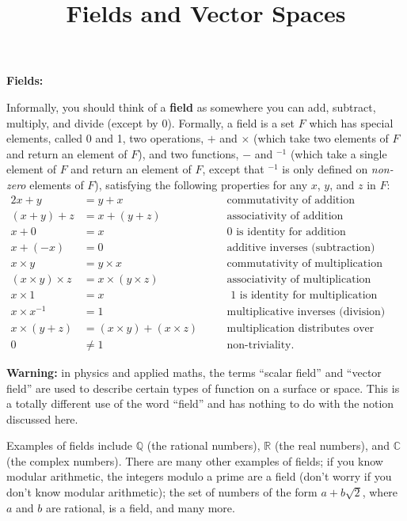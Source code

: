 \documentclass{article}
\begin{document}
\title{Fields and Vector Spaces}
\date{}

\maketitle
\thispagestyle{empty}

\Large



\textbf{Fields:}\bigskip

Informally, you should think of a \textbf{field} as somewhere you can add, subtract, multiply, and divide (except by 0). Formally, a field is a set $F$ which has special elements, called 0 and 1, two operations, $+$ and $\times$ (which take two elements of $F$ and return an element of $F$), and two functions, $-$ and ${}^{-1}$ (which take a single element of $F$ and return an element of $F$, except that ${}^{-1}$ is only defined on \textit{non-zero} elements of $F$), satisfying the following properties for any $x$, $y$, and $z$ in $F$:
\begin{alignat*}{2}
	x+y&=y+x&& \mbox{commutativity of addition}\\
	(x+y)+z&=x+(y+z)&& \mbox{associativity of addition}\\
	x+0&=x&& \mbox{0 is identity for addition}\\
	x+(-x)&= 0&&\mbox{additive inverses (subtraction)}\\
	x\times y&=y\times x&&\mbox{commutativity of multiplication}\\
	(x\times y)\times z&=x\times (y\times z) &&\mbox{associativity of multiplication}\\
	x\times 1 &= x&&\mbox{ 1 is identity for multiplication}\\
	x\times x^{-1}&=1&&\mbox{multiplicative inverses (division)}\\
	x\times (y+z)&=(x\times y)+(x\times z) \quad&&\mbox{multiplication distributes over addition}\\
	0&\neq 1 &&\mbox{non-triviality.}
\end{alignat*}

\textbf{Warning:} in physics and applied maths, the terms ``scalar field'' and ``vector field'' are used to describe certain types of function on a surface or space. This is a totally different use of the word ``field'' and has nothing to do with the notion discussed here.\medskip

Examples of fields include $\mathbb{Q}$ (the rational numbers), $\mathbb{R}$ (the real numbers), and $\mathbb{C}$ (the complex numbers). There are many other examples of fields; if you know modular arithmetic, the integers modulo a prime are a field (don't worry if you don't know modular arithmetic); the set of numbers of the form $a+b\sqrt{2}$, where $a$ and $b$ are rational, is a field, and many more.
\end{document}
